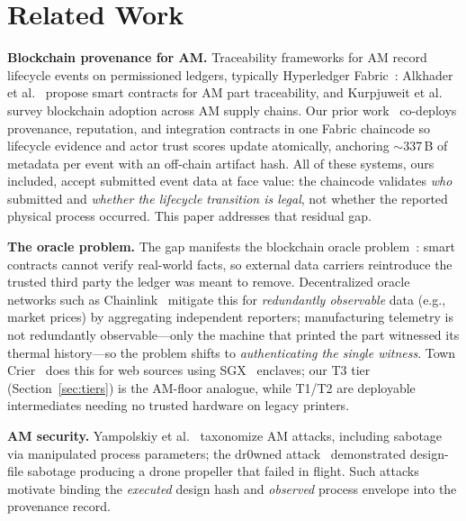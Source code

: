 \section{Related Work}
\label{sec:related_work}

\textbf{Blockchain provenance for AM.}
Traceability frameworks for AM record lifecycle events on permissioned
ledgers, typically Hyperledger Fabric~\cite{androulaki2018hyperledger}:
Alkhader et al.~\cite{alkhader2020blockchain} propose smart contracts for
AM part traceability, and Kurpjuweit et al.~\cite{kurpjuweit2021blockchain}
survey blockchain adoption across AM supply chains.  Our prior
work~\cite{anonymous2026unified} co-deploys provenance, reputation, and
integration contracts in one Fabric chaincode so lifecycle evidence and
actor trust scores update atomically, anchoring $\sim$337\,B of metadata
per event with an off-chain artifact hash.  All of these systems, ours
included, accept submitted event data at face value: the chaincode
validates \emph{who} submitted and \emph{whether the lifecycle transition
is legal}, not whether the reported physical process occurred.  This paper
addresses that residual gap.

\textbf{The oracle problem.}
The gap manifests the blockchain oracle
problem~\cite{caldarelli2020oracle}: smart contracts cannot verify
real-world facts, so external data carriers reintroduce the trusted third
party the ledger was meant to remove.  Decentralized oracle networks such
as Chainlink~\cite{breidenbach2021chainlink} mitigate this for
\emph{redundantly observable} data (e.g., market prices) by aggregating
independent reporters; manufacturing telemetry is not redundantly
observable---only the machine that printed the part witnessed its thermal
history---so the problem shifts to \emph{authenticating the single
witness}.  Town Crier~\cite{zhang2016towncrier} does this for web sources
using SGX~\cite{costan2016sgx} enclaves; our T3 tier
(Section~\ref{sec:tiers}) is the AM-floor analogue, while T1/T2 are
deployable intermediates needing no trusted hardware on legacy printers.

\textbf{AM security.}
Yampolskiy et al.~\cite{yampolskiy2018security} taxonomize AM attacks,
including sabotage via manipulated process parameters; the dr0wned
attack~\cite{belikovetsky2017dr0wned} demonstrated design-file sabotage
producing a drone propeller that failed in flight.  Such attacks motivate
binding the \emph{executed} design hash and \emph{observed} process
envelope into the provenance record.

